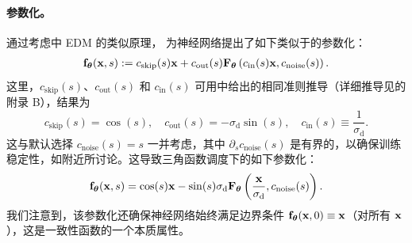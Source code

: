 \paragraph{参数化。}
通过考虑中 EDM 的类似原理，\citet{lu2024simplifying} 为神经网络提出了如下类似于的参数化：
\begin{align*}
    {\mathbf{f}}_{\bm{\theta}}({\mathbf{x}}, s) := c_{\mathrm{skip}}(s){\mathbf{x}} + c_{\mathrm{out}}(s){\mathbf{F}}_{\bm{\theta}}\left(c_{\mathrm{in}}(s){\mathbf{x}}, c_{\mathrm{noise}}(s)\right).
\end{align*}
这里，$c_{\mathrm{skip}}(s)$、$c_{\mathrm{out}}(s)$ 和 $c_{\mathrm{in}}(s)$ 可用中给出的相同准则推导（详细推导见\citet{lu2024simplifying}的附录 B），结果为
\[
c_{\mathrm{skip}}(s) = \cos(s), \quad c_{\mathrm{out}}(s) = -\sigma_{\mathrm{d}} \sin(s), \quad c_{\mathrm{in}}(s) \equiv \frac{1}{\sigma_{\mathrm{d}}}.
\]
这与默认选择 $c_{\mathrm{noise}}(s) = s$ 一并考虑，其中 $\partial_s c_{\mathrm{noise}}(s)$ 是有界的，以确保训练稳定性，如附近所讨论。这导致三角函数调度下的如下参数化：
\begin{align}\label{eq:trig-nn}
    {\mathbf{f}}_{\bm{\theta}}({\mathbf{x}}, s) = \cos(s){\mathbf{x}} - \sin(s)\sigma_{\mathrm{d}}{\mathbf{F}}_{\bm{\theta}}\left(\frac{{\mathbf{x}}}{\sigma_{\mathrm{d}}}, c_{\mathrm{noise}}(s)\right).
\end{align}
我们注意到，该参数化还确保神经网络始终满足边界条件 ${\mathbf{f}}_{\bm{\theta}}({\mathbf{x}}, 0) \equiv {\mathbf{x}}$（对所有 ${\mathbf{x}}$），这是一致性函数的一个本质属性。



